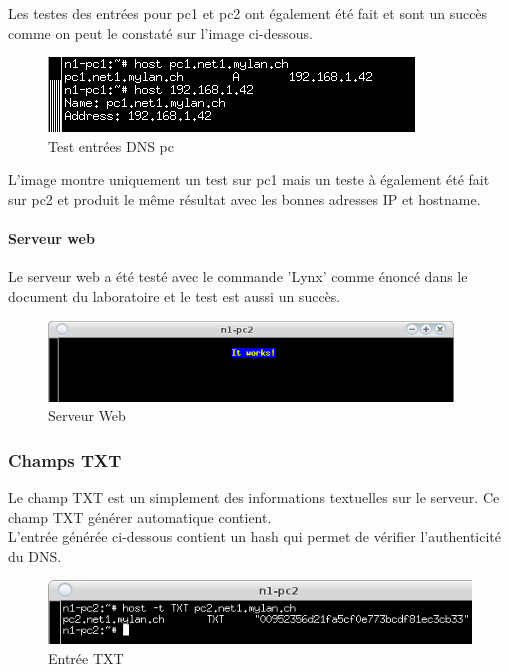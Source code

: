 \documentclass{article}
\begin{document}
Les testes des entrées pour pc1 et pc2 ont également été fait et sont un succès comme on peut le constaté sur l'image ci-dessous.

\begin{figure}[!ht]
	\centering
	\includegraphics{./captures/2-test-dns-pc1.png}
	\caption{Test entrées DNS pc}
	\label{fig:Test entrées DNS pc}
\end{figure}

L'image montre uniquement un test sur pc1 mais un teste à également été fait sur pc2 et produit le même résultat avec les bonnes adresses IP et hostname.

\paragraph{Serveur web}

Le serveur web a été testé avec le commande 'Lynx' comme énoncé dans le document du laboratoire et le test est aussi un succès. \cite{doc-labo}

\begin{figure}[!ht]
	\centering
	\includegraphics{./captures/ItWorks-www.png}
	\caption{Serveur Web}
	\label{fig:Serveur Web}
\end{figure}

\subsubsection{Champs TXT}

Le champ TXT est un simplement des informations textuelles sur le serveur. Ce champ TXT générer automatique contient. \cite{TXT}\\

L'entrée générée ci-dessous contient un hash qui permet de vérifier l'authenticité du DNS.

\begin{figure}[!ht]
	\centering
	\includegraphics{./captures/txt-entry.png}
	\caption{Entrée TXT}
	\label{fig:Entrée TXT}
\end{figure}
\end{document}

